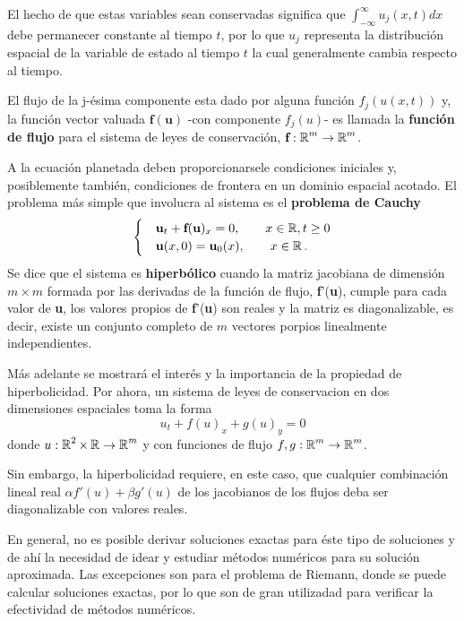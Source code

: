 El hecho de que estas variables sean conservadas significa que $\int_{-\infty}^{\infty} u_j(x,t) dx$ debe permanecer constante al tiempo $t$, por lo que $u_j$ representa la distribución espacial de la variable de estado al tiempo $t$ la cual generalmente cambia respecto al tiempo.

El flujo de la j-ésima componente esta dado por alguna función $f_j(u(x,t))$ y, la función vector valuada $\textbf{f}(\textbf{u})$ -con componente $f_j(u)$- es llamada la \textbf{función de flujo} para el sistema de leyes de conservación, $\textbf{f}:\operatorname{\mathbb R}^m \rightarrow \operatorname{\mathbb R}^m$.

A la ecuación planetada deben proporcionarsele condiciones iniciales y, posiblemente también, condiciones de frontera en un dominio espacial acotado.  El problema más simple que involucra al sistema es el \textbf{problema de Cauchy}
\[
\begin{cases}
&\textbf{u}_t + \textbf{f}(\textbf{u})_x = 0, \qquad x \in \operatorname{\mathbb R}, t \geq 0 \\
&\textbf{u}(x,0) = \textbf{u}_0(x), \qquad x \in \operatorname{\mathbb R}.
\end{cases}
\]
Se dice que el sistema es \textbf{hiperbólico} cuando la matriz jacobiana de dimensión $m\times m$ formada por las derivadas de la función de flujo, \textbf{f}'(\textbf{u}), cumple para cada valor de \textbf{u}, los valores propios de \textbf{f}'(\textbf{u}) son reales y la matriz es diagonalizable, es decir, existe un conjunto completo de $m$ vectores porpios linealmente independientes.

Más adelante se mostrará el interés y la importancia de la propiedad de hiperbolicidad. Por ahora, un sistema de leyes de conservacion en dos dimensiones espaciales toma la forma
\[
u_t + f(u)_x + g(u)_y = 0
\]
donde $u:\operatorname{\mathbb R}^2\times \operatorname{\mathbb R} \rightarrow \operatorname{\mathbb R}^m$ y con funciones de flujo $f,g:\operatorname{\mathbb R}^m \rightarrow \operatorname{\mathbb R}^m$.

Sin embargo, la hiperbolicidad requiere, en este caso, que cualquier combinación lineal real $\alpha f'(u) + \beta g'(u)$ de los jacobianos de los flujos deba ser diagonalizable con valores reales.

En general, no es posible derivar soluciones exactas para éste tipo de soluciones y de ahí la necesidad de idear y estudiar métodos numéricos para su solución aproximada. Las excepciones son para el problema de Riemann, donde se puede calcular soluciones exactas, por lo que son de gran utilizadad para verificar la efectividad de métodos numéricos.

